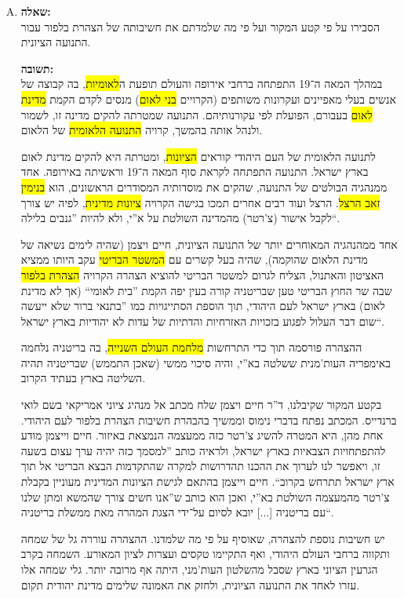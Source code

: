 \documentclass[a4paper]{article}
\newcommand\hl[1]   {\colorbox{yellow}{\!\!#1\!\!}}
\begin{document}
		\begin{enumerate}[A.]
			\item \textbf{שאלה: }\\
			הסבירו על פי קטע המקור ועל פי מה שלמדתם את חשיבותה של הצהרת בלפור עבור התנועה הציונית. 
			
			\textbf{תשובה: }\\
			במהלך המאה ה־19 התפתחה ברחבי אירופה והעולם תופעת ה\hl{לאומיות}, בה קבוצה של אנשים בעלי מאפיינים ועקרונות משותפים (הקרויים \hl{בני לאום}) מנסים לקדם הקמת \hl{מדינת לאום} בעבורם, הפועלת לפי עקורנותיהם. התנועה שמטרתה להקים מדינה זו, לשמור ולנהל אותה בהמשך, קרויה \hl{התנועה הלאומית} של הלאום. 
			
			לתנועה הלאומית של העם היהודי קוראים \hl{הציונות}, ומטרתה היא להקים מדינת לאום בארץ ישראל. התנועה התפתחה לקראת סוף המאה ה־19 וראשיתה באירופה. אחד ממנהגיה הבולטים של התנועה, שהקים את מוסדותיה המסודרים הראשונים, הוא \hl{בנימין זאב הרצל}. הרצל ועוד רבים אחרים תמכו בגישה הקרויה \hl{ציונות מדינית}, לפיה יש צורך לקבל אישור (צ'רטר) מהמדינה השולטת על א''י, ולא להיות ''גנבים בלילה``.
			
			אחד ממהנהגיה המאוחרים יותר של התנועה הציונית, חיים ויצמן (שהיה לימים נשיאה של מדינת הלאום שהוקמה), שהיה בעל קשרים עם \hl{המשטר הבריטי} עקב היותו ממציא האציטון והאתנול, הצליח לגרום למשטר הבריטי להוציא הצהרה הקרויה \hl{הצהרת בלפור} שבה שר החוץ הבריטי טען שבריטניה קורה בעין יפה הקמת ''בית לאומי`` (אך \textit{לא} מדינת לאום) בארץ ישראל לעם היהודי, תוך הוספת הסתייגויות כמו ''בתנאי ברור שלא ייעשה שום דבר העלול לפגוע בזכויות האזרחיות והדתיות של עדות לא יהודיות בארץ ישראל``. 
			
			ההצהרה פורסמה תוך כדי התרחשות \hl{מלחמת העולם השנייה}, בה בריטניה נלחמה באימפריה  העות'מנית ששלטה בא''י, והיה סיכוי ממשי (שאכן התממש) שבריטניה תהיה השליטה בארץ בעתיד הקרוב. 
			
			בקטע המקור שקיבלנו, ד''ר חיים ויצמן שלח מכתב אל מנהיג ציוני אמריקאי בשם לואי ברנדייס. המכתב נפתח בדברי נימוס וממשיך בהבהרת חשיבות הצהרת בלפור לעם היהודי. אחת מהן, היא המטרה להשיג צ'רטר כזה ממעצמה הנמצאת באיזור. חיים וייצמן מודע להתפתחויות הצבאיות בארץ ישראל, ולראיה כותב ''למסמך כזה יהיה ערך עצום בשעה זו, ויאפשר לנו לערוך את ההכנו תהדרושות למקרה שהתקדמות הבצא הבריטי אל תוך ארץ ישראל תתרחש בקרוב``. חיים וייצמן בהתאם לגישת הציונות המדינית מעוניין בקבלת צ'רטר מהמעצמה השולטת בא''י, ואכן הוא כותב ש''אנו חשים צורך שהמשא ומתן שלנו עם בריטניה [...] יובא לסיום על־ידי הצגת המהרה מאת ממשלת בריטניה``. 
			
			יש חשיבות נוספת להצהרה, שאוסיף על פי מה שלמדנו. ההצהרה עוררה גל של שמחה ותקווה ברחבי העולם היהודי, ואף התקיימו טקסים ועצרות לציון המאורע. השמחה בקרב הגרעין הציוני בארץ שסבל מהשלטון העות'מני, היתה אף מרובה יותר. גלי שמחה אלו עזרו לאחד את התנועה הציונית, ולחזק את האמונה שלימים מדינת יהודית תקום. 
			

\end{enumerate}
\end{document}
